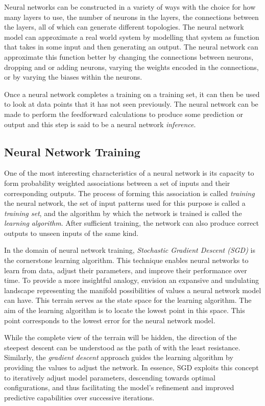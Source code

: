 Neural networks can be constructed in a variety of ways with the choice for how many layers to use, the number of neurons in the layers, the connections between the layers, all of which can generate different topologies. The neural network model can approximate a real world system by modelling that system as function that takes in some input and then generating an output. The neural network can approximate this function better by changing the connections between neurons, dropping and or adding neurons, varying the weights encoded in the connections, or by varying the biases within the neurons.

Once a neural network completes a training on a training set, it can then be used to look at data points that it has not seen previously. The neural network can be made to perform the feedforward calculations to produce some prediction or output and this step is said to be a neural network \textit{inference}.

\subsection{Neural Network Training}

One of the most interesting characteristics of a neural network is its capacity to form probability weighted associations between a set of inputs and their corresponding outputs. The process of forming this association is called \textit{training} the neural network, the set of input patterns used for this purpose is called a \textit{training set}, and the algorithm by which the network is trained is called the \textit{learning algorithm}. After sufficient training, the network can also produce correct outputs to unseen inputs of the same kind.

In the domain of neural network training, \textit{Stochastic Gradient Descent (SGD)} is the cornerstone learning algorithm. This technique enables neural networks to learn from data, adjust their parameters, and improve their performance over time. To provide a more insightful analogy, envision an expansive and undulating landscape representing the manifold possibilities of values a neural network model can have. This terrain serves as the state space for the learning algorithm. The aim of the learning algorithm is to locate the lowest point in this space. This point corresponds to the lowest error for the neural network model.

While the complete view of the terrain will be hidden, the direction of the steepest descent can be understood as the path of with the least resistance. Similarly, the \textit{gradient descent} approach guides the learning algorithm by providing the values to adjust the network. In essence, SGD exploits this concept to iteratively adjust model parameters, descending towards optimal configurations, and thus facilitating the model's refinement and improved predictive capabilities over successive iterations.

